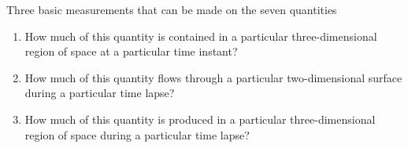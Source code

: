 \begin{definition}{Three basic measurements that can be made on the seven quantities}
  \begin{enumerate}[label=\arabic*.]\bfseries
  \item How much of this quantity is contained in a particular three-dimensional region of space at a particular time instant?

  \item How much of this quantity flows through a particular two-dimensional surface during a particular time lapse?

  \item How much of this quantity is produced in a particular three-dimensional region of space during a particular time lapse?
  \end{enumerate}
\end{definition}
%

